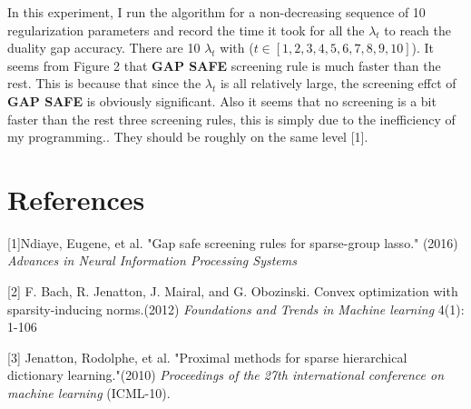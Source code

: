 \documentclass{article}
\begin{document}
In this experiment, I run the algorithm for a non-decreasing sequence of 10 regularization parameters and record the time it took for all the $\lambda_t$ to reach the duality gap accuracy. There are 10 $\lambda_t$  with ($t \in [1,2,3,4,5,6,7,8,9,10]$).  It seems from Figure 2 that \textbf{GAP SAFE} screening rule is much faster than the rest. This is because that since the $\lambda_t$ is all relatively large, the screening effct of \textbf{GAP SAFE} is obviously significant.  Also it seems that no screening is a bit faster than the rest three screening rules, this is simply due to the inefficiency of my programming..  They should be roughly on the same level [1]. 



\section*{References}


\small


[1]Ndiaye, Eugene, et al. "Gap safe screening rules for sparse-group lasso." (2016) {\it Advances in Neural Information Processing
  Systems}

[2] F. Bach, R. Jenatton, J. Mairal, and G. Obozinski. Convex optimization with sparsity-inducing norms.(2012) {\it Foundations and Trends in Machine learning} 4(1): 1-106

[3] Jenatton, Rodolphe, et al. "Proximal methods for sparse hierarchical dictionary learning."(2010) {\it Proceedings of the 27th international conference on machine learning} (ICML-10).
\end{document}
